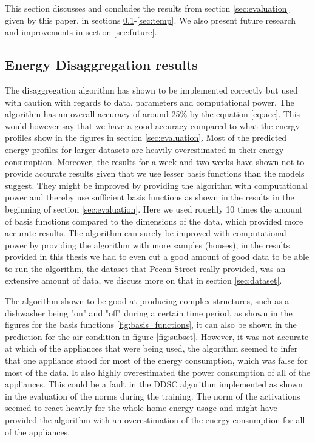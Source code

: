 This section discusses and concludes the results from section \ref{sec:evaluation} given by this paper, in sections \ref{sec:results}-\ref{sec:temp}. We also present future research and improvements in section \ref{sec:future}.

\subsection{Energy Disaggregation results}
\label{sec:results}
The disaggregation algorithm has shown to be implemented correctly but used with caution with regards to data, parameters and computational power. The algorithm has an overall accuracy of around 25\% by the equation \ref{eq:acc}. This would however say that we have a good accuracy compared to what the energy profiles show in the figures in section \ref{sec:evaluation}. Most of the predicted energy profiles for larger datasets are heavily overestimated in their energy consumption. Moreover, the results for a week and two weeks have shown not to provide accurate results given that we use lesser basis functions than the models suggest. They might be improved by providing the algorithm with computational power and thereby use sufficient basis functions as shown in the results in the beginning of section \ref{sec:evaluation}. Here we used roughly 10 times the amount of basis functions compared to the dimensions of the data, which provided more accurate results. The algorithm can surely be improved with computational power by providing the algorithm with more samples (houses), in the results provided in this thesis we had to even cut a good amount of good data to be able to run the algorithm, the dataset that Pecan Street \cite{pecan} really provided, was an extensive amount of data, we discuss more on that in section \ref{sec:dataset}.

The algorithm shown to be good at producing complex structures, such as a dishwasher being "on" and "off" during a certain time period, as shown in the figures for the basis functions \ref{fig:basis_functions}, it can also be shown in the prediction for the air-condition in figure \ref{fig:subset}. However, it was not accurate at which of the appliances that were being used, the algorithm seemed to infer that one appliance stood for most of the energy consumption, which was false for most of the data. It also highly overestimated the power consumption of all of the appliances. This could be a fault in the DDSC algorithm implemented as shown in the evaluation of the norms during the training. The norm of the activations seemed to react heavily for the whole home energy usage and might have provided the algorithm with an overestimation of the energy consumption for all of the appliances.

